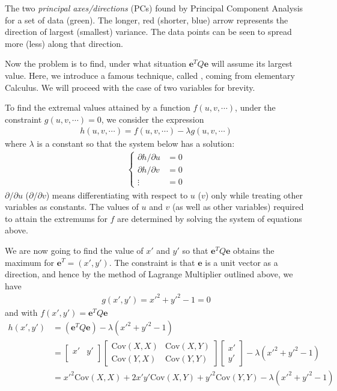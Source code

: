 The two \textit{principal axes/directions} (PCs) found by Principal Component Analysis for a set of data (green). The longer, red (shorter, blue) arrow represents the direction of largest (smallest) variance. The data points can be seen to spread more (less) along that direction. \par
Now the problem is to find, under what situation $\textbf{e}^T Q \textbf{e}$ will assume its largest value. Here, we introduce a famous technique, called , coming from elementary Calculus. We will proceed with the case of two variables for brevity.
\begin{thm}
\label{thm:LagrangeMul}
To find the extremal values attained by a function $f(u,v,\cdots)$, under the constraint $g(u,v,\cdots) = 0$, we consider the expression
\begin{align*}
h(u,v,\cdots) = f(u,v,\cdots) - \lambda g(u,v,\cdots)
\end{align*}
where $\lambda$ is a constant so that the system below has a solution:
\begin{align*}
\begin{cases}
\partial h/\partial u &= 0 \\
\partial h/\partial v &= 0 \\
\vdots &= 0
\end{cases}
\end{align*}
$\partial/\partial u$ ($\partial/\partial v$) means differentiating with respect to $u$ ($v$) only while treating other variables as constants. The values of $u$ and $v$ (as well as other variables) required to attain the extremums for $f$ are determined by solving the system of equations above. 
\end{thm}
We are now going to find the value of $x'$ and $y'$ so that $\textbf{e}^T Q \textbf{e}$ obtains the maximum for $\textbf{e}^T = (x',y')$. The constraint is that $\textbf{e}$ is a unit vector as a direction, and hence by the method of Lagrange Multiplier outlined above, we have
\begin{align*}
g(x',y') = x'^2 + y'^2 - 1 = 0
\end{align*}
and with $f(x',y') = \textbf{e}^T Q \textbf{e}$
\begin{align*}
h(x',y') &= (\textbf{e}^T Q \textbf{e}) - \lambda(x'^2 + y'^2 - 1) \\
&= \begin{bmatrix}
x' & y' \\
\end{bmatrix}
\begin{bmatrix}
\text{Cov}(X, X) & \text{Cov}(X, Y) \\
\text{Cov}(Y, X) & \text{Cov}(Y, Y) 
\end{bmatrix}
\begin{bmatrix}
x' \\
y'
\end{bmatrix}
- \lambda(x'^2 + y'^2 - 1) \\
&= x'^2 \text{Cov}(X, X) + 2x'y' \text{Cov}(X, Y) + y'^2\text{Cov}(Y, Y) - \lambda(x'^2 + y'^2 - 1)
\end{align*}
